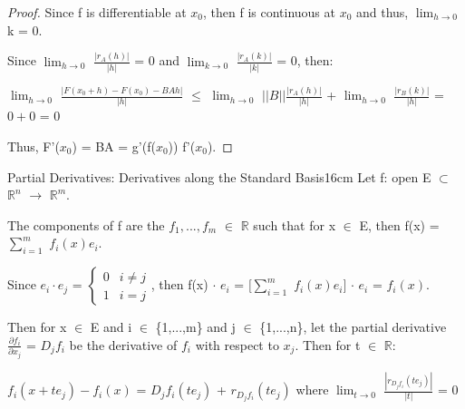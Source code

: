 \begin{proof}
        Since f is differentiable at $x_0$, then f is continuous at $x_0$
        and thus, $\lim_{h \rightarrow 0}$ k = 0.

        Since $\lim_{h \rightarrow 0}$ $\frac{|r_A(h)|}{|h|}$ = 0
        and $\lim_{k \rightarrow 0}$ $\frac{|r_A(k)|}{|k|}$ = 0, then:

        \hspace{0.5cm}
        $\lim_{h \rightarrow 0}$ $\frac{|F(x_0+h) - F(x_0) - BAh|}{|h|}$
        $\leq$ $\lim_{h \rightarrow 0}$ $||B|| \frac{|r_A(h)|}{|h|}$
                + $\lim_{h \rightarrow 0}$ $\frac{|r_B(k)|}{|h|}$
        = $0+0$ = 0

        Thus, F'($x_0$) = BA = g'(f($x_0$)) f'($x_0$).
    \end{proof}

    \vspace{0.5cm}



    \begin{definition}{Partial Derivatives: Derivatives along
    the Standard Basis}{16cm}
        Let f: open E $\subset$ $\mathbb{R}^n$ $\rightarrow$ $\mathbb{R}^m$.

        The components of f are the $f_1,...,f_m$ $\in$ $\mathbb{R}$ such that
        for x $\in$ E, then f(x) = $\sum_{i=1}^m$ $f_i(x) e_i$.

        Since $e_i \cdot e_j$ =
        $
        \begin{cases}
            0 & i \not = j \\
            1 & i = j
        \end{cases}$, then
        f(x) $\cdot$ $e_i$
        = $[\sum_{i=1}^m$ $f_i(x) e_i]$ $\cdot$ $e_i$
        = $f_i(x)$.

        \vspace{0.2cm}

        Then for x $\in$ E and i $\in$ \{1,...,m\} and j $\in$ \{1,...,n\},
        let the {\color{lblue} partial derivative}
        $\frac{\partial f_i}{\partial x_j}$ = $D_jf_i$
        be the derivative of $f_i$ with respect to $x_j$.
        Then for t $\in$ $\mathbb{R}$:

        \hspace{0.5cm}
        $f_i(x+te_j) - f_i(x)$ = $D_jf_i(te_j)$ + $r_{D_jf_i}(te_j)$
        \hspace{0.7cm}
        where $\lim_{t \rightarrow 0}$ $\frac{|r_{D_jf_i}(te_j)|}{|t|}$ = 0
    \end{definition}

